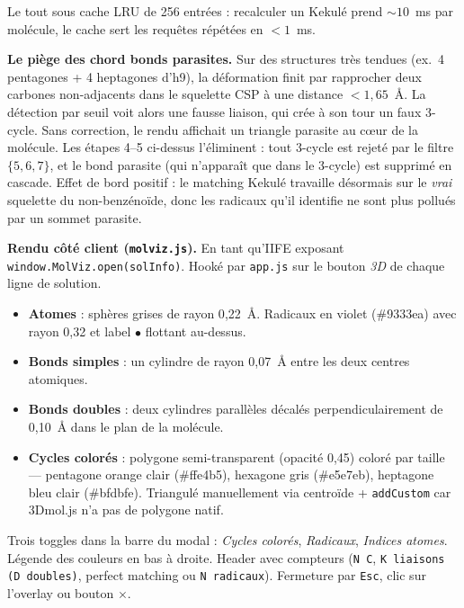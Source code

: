 Le tout sous cache LRU de 256 entrées : recalculer un Kekulé prend ${\sim}10$~ms
par molécule, le cache sert les requêtes répétées en $<1$~ms.

\textbf{Le piège des chord bonds parasites.} Sur des structures très tendues
(ex.~4 pentagones + 4 heptagones d'h9), la déformation finit par rapprocher deux
carbones non-adjacents dans le squelette CSP à une distance $< 1{,}65$~\AA.
La détection par seuil voit alors une fausse liaison, qui crée à son tour un
faux 3-cycle. Sans correction, le rendu affichait un triangle parasite au c\oe{}ur
de la molécule. Les étapes 4--5 ci-dessus l'éliminent : tout 3-cycle est rejeté
par le filtre $\{5,6,7\}$, et le bond parasite (qui n'apparaît que dans le
3-cycle) est supprimé en cascade. Effet de bord positif : le matching Kekulé
travaille désormais sur le \emph{vrai} squelette du non-benzénoïde, donc les
radicaux qu'il identifie ne sont plus pollués par un sommet parasite.

\textbf{Rendu côté client (\texttt{molviz.js}).} En tant qu'IIFE exposant
\texttt{window.MolViz.open(solInfo)}. Hooké par \texttt{app.js} sur le bouton
\emph{3D} de chaque ligne de solution.

\begin{itemize}
  \item \textbf{Atomes} : sphères grises de rayon 0{,}22~\AA. Radicaux en violet
    (\#9333ea) avec rayon 0{,}32 et label \og{}$\bullet$\fg{} flottant au-dessus.
  \item \textbf{Bonds simples} : un cylindre de rayon 0{,}07~\AA{} entre les deux
    centres atomiques.
  \item \textbf{Bonds doubles} : deux cylindres parallèles décalés perpendiculairement
    de 0{,}10~\AA{} dans le plan de la molécule.
  \item \textbf{Cycles colorés} : polygone semi-transparent (opacité 0{,}45) coloré
    par taille --- pentagone orange clair (\#ffe4b5), hexagone gris (\#e5e7eb),
    heptagone bleu clair (\#bfdbfe). Triangulé manuellement via centroïde +
    \texttt{addCustom} car 3Dmol.js n'a pas de polygone natif.
\end{itemize}

Trois toggles dans la barre du modal : \emph{Cycles colorés}, \emph{Radicaux},
\emph{Indices atomes}. Légende des couleurs en bas à droite. Header avec compteurs
(\texttt{N C}, \texttt{K liaisons (D doubles)}, perfect matching ou
\texttt{N radicaux}). Fermeture par \texttt{Esc}, clic sur l'overlay ou bouton
\texttt{$\times$}.

